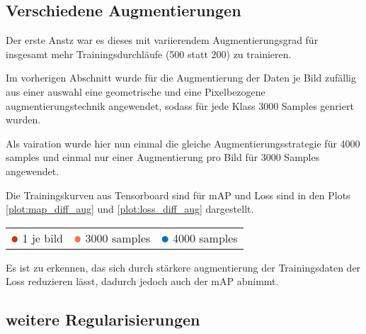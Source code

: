 \subsection{Verschiedene Augmentierungen}

Der erste Anstz war es dieses mit variierendem Augmentierungsgrad 
für insgesamt mehr Trainingsdurchläufe (500 statt 200) zu 
trainieren.

Im vorherigen Abschnitt wurde für die Augmentierung der 
Daten je Bild zufällig aus einer auswahl eine geometrische und eine 
Pixelbezogene augmentierungstechnik angewendet, sodass für jede Klass 
3000 Samples genriert wurden.

Als vairation wurde hier nun einmal die gleiche Augmentierungsstrategie 
für 4000 samples und einmal nur einer Augmentierung pro Bild für 
3000 Samples angewendet.

Die Trainingskurven aus Tensorboard sind für mAP und Loss sind in den
Plots \ref{plot:map_diff_aug} und \ref{plot:loss_diff_aug} dargestellt.
\vspace{1cm}

\begin{minipage}{0.5\textwidth}
  \centering
  \label{plot:map_diff_aug}
  \def\svgwidth{0.9\textwidth}
  
\end{minipage}
\begin{minipage}{0.5\textwidth}
  \centering
  \label{plot:loss_diff_aug}
  \def\svgwidth{0.9\textwidth}
  
\end{minipage}

\begin{table}[htb]
  \centering
  \begin{tabular}{m{}<{\centering}m{}<{\centering}m{}<{\centering}}
    $\color[HTML]{CC3311}\medbullet$  1 je bild & $\color[HTML]{FF7043}\medbullet$  3000 samples & $\color[HTML]{0077BB}\medbullet$  4000 samples
  \end{tabular}    
\end{table}

Es ist zu erkennen, das sich durch stärkere augmentierung der Trainingsdaten
der Loss reduzieren lässt, dadurch jedoch auch der mAP abnimmt.




\subsection{weitere Regularisierungen}

